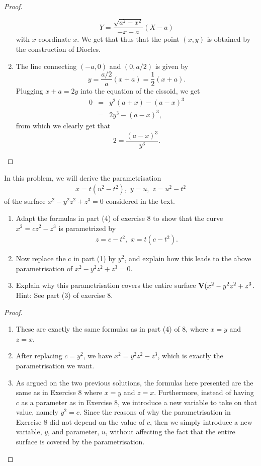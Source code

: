 \begin{proof}
\begin{enumerate}
    $$Y = \frac{\sqrt{a^2 - x^2}}{-x-a}(X-a)$$
    with $x$-coordinate $x$. We get that thus that the point $(x,y)$ is obtained by the construction of Diocles.
    \item The line connecting $(-a,0)$ and $(0,a/2)$ is given by
    $$y = \frac{a/2}{a}(x+a) = \frac{1}{2}(x+a).$$
    Plugging $x+a = 2y$ into the equation of the cissoid, we get
    \begin{eqnarray*}
        0
        & = & y^2 (a+x) - (a-x)^3\\
        & = & 2y^3 - (a-x)^3,
    \end{eqnarray*}
    from which we clearly get that
    $$2 = \frac{(a-x)^3}{y^3}.$$
\end{enumerate}
\end{proof}

\begin{exercise}{11}
In this problem, we will derive the parametrisation
\begin{align*}
    x = t(u^2-t^2),\,\, y = u,\,\, z = u^2-t^2
\end{align*}
of the surface $x^2-y^2z^2+z^3=0$ considered in the text.
\begin{enumerate}
    \item Adapt the formulas in part (4) of exercise 8 to show that the curve $x^2 = cz^2-z^3$ is parametrized by 
    \begin{align*}
        z=c-t^2,\,\, x=t(c-t^2).
    \end{align*}
    \item Now replace the c in part (1) by $y^2$, and explain how this leads to the above parametrisation of $x^2-y^2z^2+z^3=0$.
    \item Explain why this parametrisation covers the entire surface $\mathbf{V}(x^2-y^2z^2+z^3$. Hint: See part (3) of exercise 8.
\end{enumerate}
\end{exercise}
\begin{proof}
\begin{enumerate}
    \item These are exactly the same formulas as in part (4) of 8, where $x=y$ and $z=x$. 
    \item After replacing $c=y^2$, we have $x^2=y^2z^2-z^3$, which is exactly the parametrisation we want.
    \item As argued on the two previous solutions, the formulas here presented are the same as in Exercise 8 where $x=y$ and $z=x$. Furthermore, instead of having $c$ as a parameter as in Exercise 8, we introduce a new variable to take on that value, namely $y^2=c$. Since the reasons of why the parametrisation in Exercise 8 did not depend on the value of $c$, then we simply introduce a new variable, $y$, and parameter, $u$, without affecting the fact that the entire surface is covered by the parametrisation.
\end{enumerate}
\end{proof}

